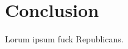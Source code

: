 \documentclass[dissertation.tex]{subfiles}
\begin{document}
\chapter{Conclusion}
\label{chap:Conclusion}

Lorum ipsum fuck Republicans.
\end{document}
